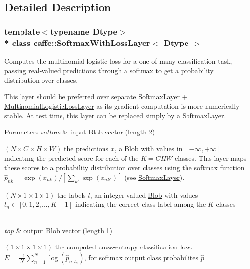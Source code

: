 \subsection{Detailed Description}
\subsubsection*{template$<$typename Dtype$>$\\*
class caffe\+::\+Softmax\+With\+Loss\+Layer$<$ Dtype $>$}

Computes the multinomial logistic loss for a one-\/of-\/many classification task, passing real-\/valued predictions through a softmax to get a probability distribution over classes. 

This layer should be preferred over separate \hyperlink{classcaffe_1_1SoftmaxLayer}{Softmax\+Layer} + \hyperlink{classcaffe_1_1MultinomialLogisticLossLayer}{Multinomial\+Logistic\+Loss\+Layer} as its gradient computation is more numerically stable. At test time, this layer can be replaced simply by a \hyperlink{classcaffe_1_1SoftmaxLayer}{Softmax\+Layer}.


\begin{DoxyParams}{Parameters}
{\em bottom} & input \hyperlink{classcaffe_1_1Blob}{Blob} vector (length 2)
\begin{DoxyEnumerate}
\item $ (N \times C \times H \times W) $ the predictions $ x $, a \hyperlink{classcaffe_1_1Blob}{Blob} with values in $ [-\infty, +\infty] $ indicating the predicted score for each of the $ K = CHW $ classes. This layer maps these scores to a probability distribution over classes using the softmax function $ \hat{p}_{nk} = \exp(x_{nk}) / \left[\sum_{k'} \exp(x_{nk'})\right] $ (see \hyperlink{classcaffe_1_1SoftmaxLayer}{Softmax\+Layer}).
\item $ (N \times 1 \times 1 \times 1) $ the labels $ l $, an integer-\/valued \hyperlink{classcaffe_1_1Blob}{Blob} with values $ l_n \in [0, 1, 2, ..., K - 1] $ indicating the correct class label among the $ K $ classes 
\end{DoxyEnumerate}\\
\hline
{\em top} & output \hyperlink{classcaffe_1_1Blob}{Blob} vector (length 1)
\begin{DoxyEnumerate}
\item $ (1 \times 1 \times 1 \times 1) $ the computed cross-\/entropy classification loss\+: $ E = \frac{-1}{N} \sum\limits_{n=1}^N \log(\hat{p}_{n,l_n}) $, for softmax output class probabilites $ \hat{p} $ 
\end{DoxyEnumerate}\\
\hline
\end{DoxyParams}


